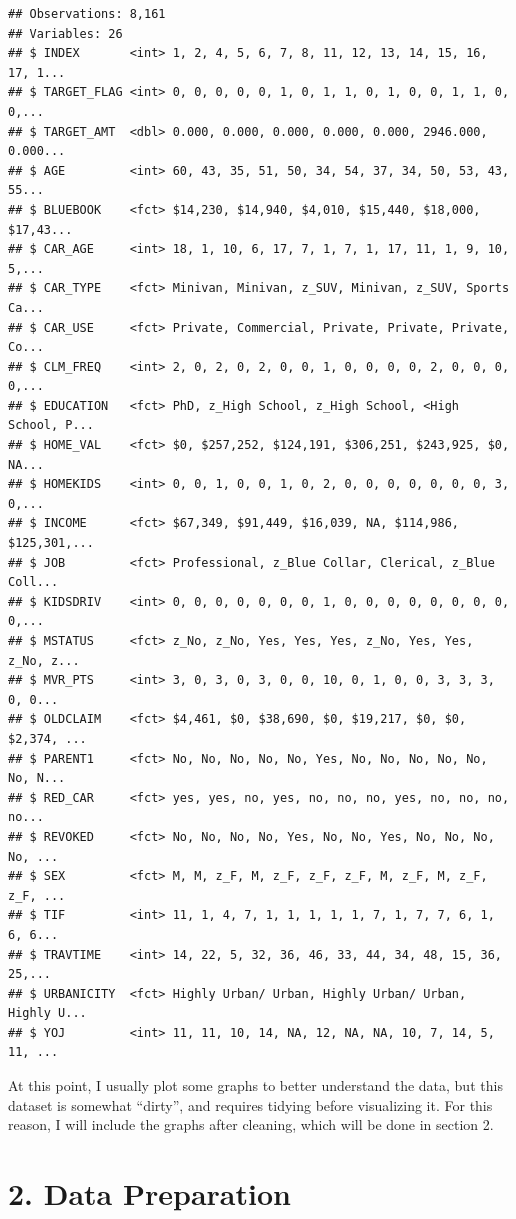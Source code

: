 \documentclass[]{article}
\begin{document}
\begin{verbatim}
## Observations: 8,161
## Variables: 26
## $ INDEX       <int> 1, 2, 4, 5, 6, 7, 8, 11, 12, 13, 14, 15, 16, 17, 1...
## $ TARGET_FLAG <int> 0, 0, 0, 0, 0, 1, 0, 1, 1, 0, 1, 0, 0, 1, 1, 0, 0,...
## $ TARGET_AMT  <dbl> 0.000, 0.000, 0.000, 0.000, 0.000, 2946.000, 0.000...
## $ AGE         <int> 60, 43, 35, 51, 50, 34, 54, 37, 34, 50, 53, 43, 55...
## $ BLUEBOOK    <fct> $14,230, $14,940, $4,010, $15,440, $18,000, $17,43...
## $ CAR_AGE     <int> 18, 1, 10, 6, 17, 7, 1, 7, 1, 17, 11, 1, 9, 10, 5,...
## $ CAR_TYPE    <fct> Minivan, Minivan, z_SUV, Minivan, z_SUV, Sports Ca...
## $ CAR_USE     <fct> Private, Commercial, Private, Private, Private, Co...
## $ CLM_FREQ    <int> 2, 0, 2, 0, 2, 0, 0, 1, 0, 0, 0, 0, 2, 0, 0, 0, 0,...
## $ EDUCATION   <fct> PhD, z_High School, z_High School, <High School, P...
## $ HOME_VAL    <fct> $0, $257,252, $124,191, $306,251, $243,925, $0, NA...
## $ HOMEKIDS    <int> 0, 0, 1, 0, 0, 1, 0, 2, 0, 0, 0, 0, 0, 0, 0, 3, 0,...
## $ INCOME      <fct> $67,349, $91,449, $16,039, NA, $114,986, $125,301,...
## $ JOB         <fct> Professional, z_Blue Collar, Clerical, z_Blue Coll...
## $ KIDSDRIV    <int> 0, 0, 0, 0, 0, 0, 0, 1, 0, 0, 0, 0, 0, 0, 0, 0, 0,...
## $ MSTATUS     <fct> z_No, z_No, Yes, Yes, Yes, z_No, Yes, Yes, z_No, z...
## $ MVR_PTS     <int> 3, 0, 3, 0, 3, 0, 0, 10, 0, 1, 0, 0, 3, 3, 3, 0, 0...
## $ OLDCLAIM    <fct> $4,461, $0, $38,690, $0, $19,217, $0, $0, $2,374, ...
## $ PARENT1     <fct> No, No, No, No, No, Yes, No, No, No, No, No, No, N...
## $ RED_CAR     <fct> yes, yes, no, yes, no, no, no, yes, no, no, no, no...
## $ REVOKED     <fct> No, No, No, No, Yes, No, No, Yes, No, No, No, No, ...
## $ SEX         <fct> M, M, z_F, M, z_F, z_F, z_F, M, z_F, M, z_F, z_F, ...
## $ TIF         <int> 11, 1, 4, 7, 1, 1, 1, 1, 1, 7, 1, 7, 7, 6, 1, 6, 6...
## $ TRAVTIME    <int> 14, 22, 5, 32, 36, 46, 33, 44, 34, 48, 15, 36, 25,...
## $ URBANICITY  <fct> Highly Urban/ Urban, Highly Urban/ Urban, Highly U...
## $ YOJ         <int> 11, 11, 10, 14, NA, 12, NA, NA, 10, 7, 14, 5, 11, ...
\end{verbatim}

At this point, I usually plot some graphs to better understand the data,
but this dataset is somewhat ``dirty'', and requires tidying before
visualizing it. For this reason, I will include the graphs after
cleaning, which will be done in section 2.

\section{2. Data Preparation}\label{data-preparation}
\end{document}
